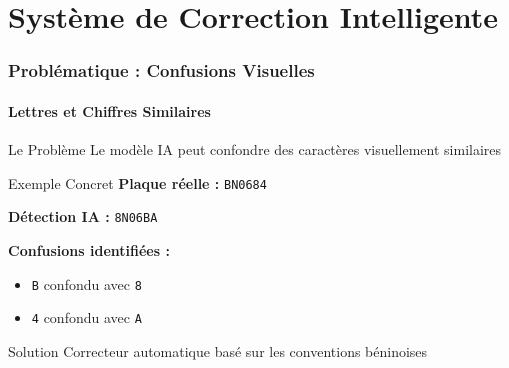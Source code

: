 \documentclass[
	11pt,
	aspectratio=169,
]{beamer}
\begin{document}

\section{Système de Correction Intelligente}

\begin{frame}
	\frametitle{Problématique : Confusions Visuelles}
	\framesubtitle{Lettres et Chiffres Similaires}
	
	\begin{alertblock}{Le Problème}
		Le modèle IA peut confondre des caractères visuellement similaires
	\end{alertblock}
	
	\smallskip
	
	\begin{exampleblock}{Exemple Concret}
		\textbf{Plaque réelle :} \texttt{BN0684}
		
		\textbf{Détection IA :} \texttt{8N06BA}
		
		\smallskip
		
		\textbf{Confusions identifiées :}
		\begin{itemize}
			\item \texttt{B} confondu avec \texttt{8}
			\item \texttt{4} confondu avec \texttt{A}
		\end{itemize}
	\end{exampleblock}
	
	\smallskip
	
	\begin{block}{Solution}
		\centering
		\alert{Correcteur automatique} basé sur les conventions béninoises
	\end{block}
\end{frame}

\end{document}
